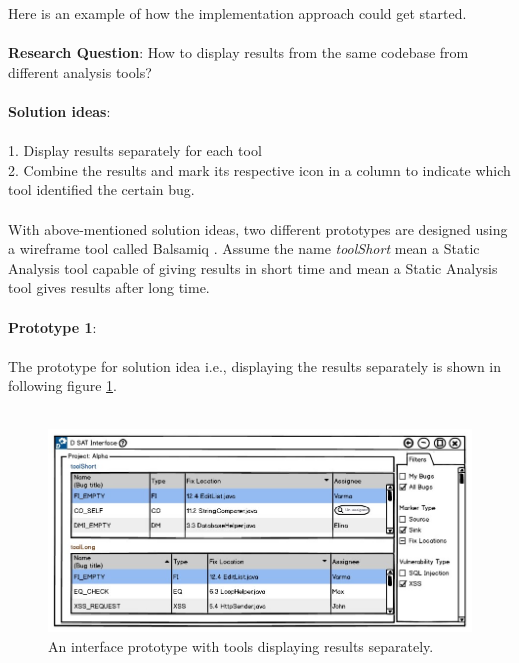 Here is an example of how the implementation approach could get started. \\ \\

\textbf{Research Question}: How to display results from the same codebase from different analysis tools? \\ \\

\textbf{Solution ideas}: \\ \\
1. Display results separately for each tool \\
2. Combine the results and mark its respective icon in a column to indicate which tool identified the certain bug. \\ \\

With above-mentioned solution ideas, two different prototypes are designed using a wireframe tool called Balsamiq \cite{B}. Assume the name \textit{toolShort} mean a Static Analysis tool capable of giving results in short time and  mean a Static Analysis tool gives results after long time. \\ \\

\textbf{Prototype 1}: \\ \\

The prototype for solution idea i.e., displaying the results separately is shown in following figure \ref{fig:toolSeperate}. \\ \\

\begin{figure}[hbt!]
	\centering
	\includegraphics[width=\linewidth]{figures/d_seperate}
	\caption{An interface prototype with tools displaying results separately.}
	\label{fig:toolSeperate}
\end{figure}
\newpage

